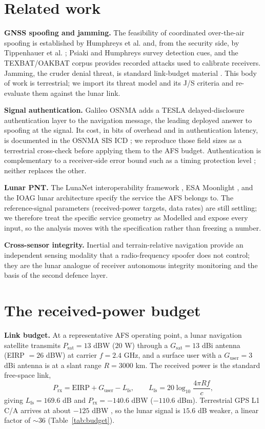 \documentclass[conference]{IEEEtran}
\begin{document}
\section{Related work}
\textbf{GNSS spoofing and jamming.} The feasibility of coordinated over-the-air
spoofing is established by Humphreys et al. \cite{humphreys} and, from the security
side, by Tippenhauer et al. \cite{tippenhauer}; Psiaki and Humphreys \cite{psiaki}
survey detection cues, and the TEXBAT/OAKBAT corpus \cite{texbat} provides recorded
attacks used to calibrate receivers. Jamming, the cruder denial threat, is standard
link-budget material \cite{kaplan}. This body of work is terrestrial; we import its
threat model and its J/S criteria and re-evaluate them against the lunar link.

\textbf{Signal authentication.} Galileo OSNMA \cite{osnma,osnmaicd} adds a TESLA
delayed-disclosure \cite{tesla} authentication layer to the navigation message,
the leading deployed answer to spoofing at the signal. Its cost, in bits of
overhead and in authentication latency, is documented in the OSNMA SIS ICD
\cite{osnmaicd}; we reproduce those field sizes as a terrestrial cross-check before
applying them to the AFS budget. Authentication is complementary to a receiver-side
error bound such as a timing protection level \cite{baweja2026tpl}; neither replaces
the other.

\textbf{Lunar PNT.} The LunaNet interoperability framework \cite{lunanet}, ESA
Moonlight \cite{moonlight}, and the IOAG lunar architecture \cite{ioag} specify the
service the AFS belongs to. The reference-signal parameters (received-power targets,
data rates) are still settling; we therefore treat the specific service geometry as
Modelled and expose every input, so the analysis moves with the specification rather
than freezing a number.

\textbf{Cross-sensor integrity.} Inertial and terrain-relative navigation
\cite{trn} provide an independent sensing modality that a radio-frequency spoofer
does not control; they are the lunar analogue of receiver autonomous integrity
monitoring and the basis of the second defence layer.

\section{The received-power budget}
\label{sec:budget}
\textbf{Link budget.} At a representative AFS operating point, a lunar navigation
satellite transmits $P_{\mathrm{sat}}=13$ dBW ($20$ W) through a $G_{\mathrm{sat}}=13$
dBi antenna (EIRP $=26$ dBW) at carrier $f=2.4$ GHz, and a surface user with a
$G_{\mathrm{user}}=3$ dBi antenna is at a slant range $R=3000$ km. The received power
is the standard free-space link,
\begin{equation}
P_{\mathrm{rx}} = \mathrm{EIRP} + G_{\mathrm{user}} - L_{\mathrm{fs}},
\qquad
L_{\mathrm{fs}} = 20\log_{10}\!\frac{4\pi R f}{c},
\label{eq:prx}
\end{equation}
giving $L_{\mathrm{fs}}=169.6$ dB and $P_{\mathrm{rx}}=-140.6$ dBW ($-110.6$ dBm).
Terrestrial GPS L1 C/A arrives at about $-125$ dBW \cite{isgps200,kaplan}, so the
lunar signal is $15.6$ dB weaker, a linear factor of $\sim$$36$
(Table~\ref{tab:budget}).
\end{document}
